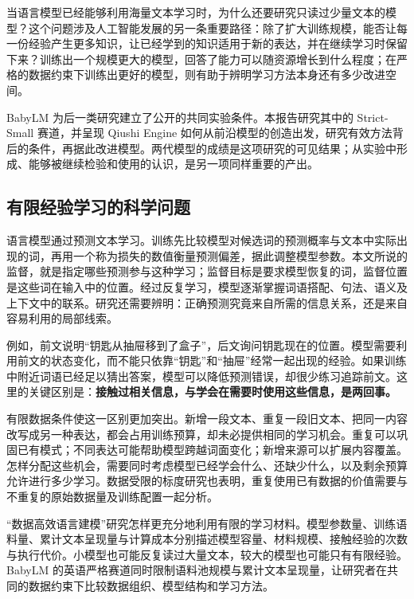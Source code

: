 \label{sec:intro}

当语言模型已经能够利用海量文本学习时，为什么还要研究只读过少量文本的模型？这个问题涉及人工智能发展的另一条重要路径：除了扩大训练规模，能否让每一份经验产生更多知识，让已经学到的知识适用于新的表达，并在继续学习时保留下来？训练出一个规模更大的模型，回答了能力可以随资源增长到什么程度；在严格的数据约束下训练出更好的模型，则有助于辨明学习方法本身还有多少改进空间。

BabyLM 为后一类研究建立了公开的共同实验条件。本报告研究其中的 Strict-Small 赛道，并呈现 Qiushi Engine 如何从前沿模型的创造出发，研究有效方法背后的条件，再据此改进模型。两代模型的成绩是这项研究的可见结果；从实验中形成、能够被继续检验和使用的认识，是另一项同样重要的产出。

\subsection{有限经验学习的科学问题}

语言模型通过预测文本学习。训练先比较模型对候选词的预测概率与文本中实际出现的词，再用一个称为损失的数值衡量预测偏差，据此调整模型参数。本文所说的监督，就是指定哪些预测参与这种学习；监督目标是要求模型恢复的词，监督位置是这些词在输入中的位置。经过反复学习，模型逐渐掌握词语搭配、句法、语义及上下文中的联系。研究还需要辨明：正确预测究竟来自所需的信息关系，还是来自容易利用的局部线索。

例如，前文说明“钥匙从抽屉移到了盒子”，后文询问钥匙现在的位置。模型需要利用前文的状态变化，而不能只依靠“钥匙”和“抽屉”经常一起出现的经验。如果训练中附近词语已经足以猜出答案，模型可以降低预测错误，却很少练习追踪前文。这里的关键区别是：\textbf{接触过相关信息，与学会在需要时使用这些信息，是两回事。}

有限数据条件使这一区别更加突出。新增一段文本、重复一段旧文本、把同一内容改写成另一种表达，都会占用训练预算，却未必提供相同的学习机会。重复可以巩固已有模式；不同表达可能帮助模型跨越词面变化；新增来源可以扩展内容覆盖。怎样分配这些机会，需要同时考虑模型已经学会什么、还缺少什么，以及剩余预算允许进行多少学习。数据受限的标度研究也表明，重复使用已有数据的价值需要与不重复的原始数据量及训练配置一起分析\citep{muennighoff2025scaling}。

“数据高效语言建模”研究怎样更充分地利用有限的学习材料。模型参数量、训练语料量、累计文本呈现量与计算成本分别描述模型容量、材料规模、接触经验的次数与执行代价。小模型也可能反复读过大量文本，较大的模型也可能只有有限经验。BabyLM 的英语严格赛道同时限制语料池规模与累计文本呈现量，让研究者在共同的数据约束下比较数据组织、模型结构和学习方法。

